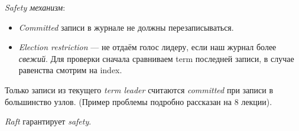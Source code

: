 \newpage
\begin{definition} \textit{Safety механизм}:
    \begin{itemize}
        \item \textit{Committed} записи в журнале не должны перезаписываться.
        \item \textit{Election restriction} --- не отдаём голос лидеру,
            если наш журнал более \textit{свежий}. Для проверки сначала сравниваем
            term последней записи, в случае равенства смотрим на index.
    \end{itemize}
\end{definition}

\begin{remark}
    Только записи из текущего \textit{term leader} считаются
    \textit{committed} при записи в большинство узлов. (Пример проблемы подробно
    рассказан на 8 лекции).
\end{remark}

\begin{proposition}
    \textit{Raft} гарантирует \textit{safety}.
\end{proposition}
